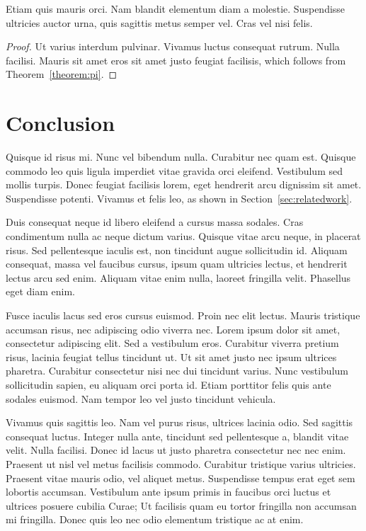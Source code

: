 \documentclass[submission]{gmp2015}
\begin{document}
\begin{corollary}
Etiam quis mauris orci. Nam blandit elementum diam a molestie. Suspendisse ultricies auctor urna, quis sagittis metus semper vel. Cras vel nisi felis.
\end{corollary}

\begin{proof}
Ut varius interdum pulvinar. Vivamus luctus consequat rutrum. Nulla facilisi. Mauris sit amet eros sit amet justo feugiat facilisis, which follows from Theorem~\ref{theorem:pi}.
\end{proof}


\section{Conclusion}

Quisque id risus mi. Nunc vel bibendum nulla. Curabitur nec quam est. Quisque commodo leo quis ligula imperdiet vitae gravida orci eleifend. Vestibulum sed mollis turpis. Donec feugiat facilisis lorem, eget hendrerit arcu dignissim sit amet. Suspendisse potenti. Vivamus et felis leo, as shown in Section~\ref{sec:relatedwork}.

Duis consequat neque id libero eleifend a cursus massa sodales. Cras condimentum nulla ac neque dictum varius. Quisque vitae arcu neque, in placerat risus. Sed pellentesque iaculis est, non tincidunt augue sollicitudin id. Aliquam consequat, massa vel faucibus cursus, ipsum quam ultricies lectus, et hendrerit lectus arcu sed enim. Aliquam vitae enim nulla, laoreet fringilla velit. Phasellus eget diam enim.

Fusce iaculis lacus sed eros cursus euismod. Proin nec elit lectus. Mauris tristique accumsan risus, nec adipiscing odio viverra nec. Lorem ipsum dolor sit amet, consectetur adipiscing elit. Sed a vestibulum eros. Curabitur viverra pretium risus, lacinia feugiat tellus tincidunt ut. Ut sit amet justo nec ipsum ultrices pharetra. Curabitur consectetur nisi nec dui tincidunt varius. Nunc vestibulum sollicitudin sapien, eu aliquam orci porta id. Etiam porttitor felis quis ante sodales euismod. Nam tempor leo vel justo tincidunt vehicula.

Vivamus quis sagittis leo. Nam vel purus risus, ultrices lacinia odio. Sed sagittis consequat luctus. Integer nulla ante, tincidunt sed pellentesque a, blandit vitae velit. Nulla facilisi. Donec id lacus ut justo pharetra consectetur nec nec enim. Praesent ut nisl vel metus facilisis commodo. Curabitur tristique varius ultricies. Praesent vitae mauris odio, vel aliquet metus. Suspendisse tempus erat eget sem lobortis accumsan. Vestibulum ante ipsum primis in faucibus orci luctus et ultrices posuere cubilia Curae; Ut facilisis quam eu tortor fringilla non accumsan mi fringilla. Donec quis leo nec odio elementum tristique ac at enim.
\end{document}
